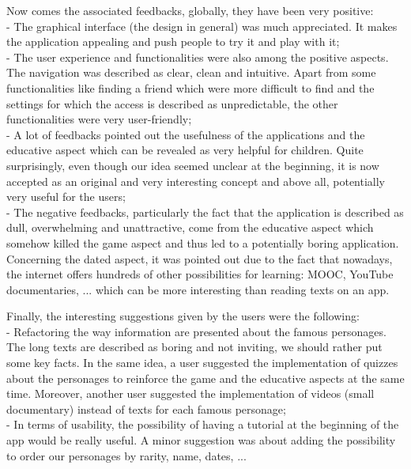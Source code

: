 \documentclass[12pt]{scrartcl}
\begin{document}
	Now comes the associated feedbacks, globally, they have been very positive:\\

		- The graphical interface (the design in general) was much appreciated. It makes the application appealing and push people to try it and play with it;\\

		- The user experience and functionalities were also among the positive aspects. The navigation was described as clear, clean and intuitive. Apart from some functionalities like finding a friend which were more difficult to find and the settings for which the access is described as unpredictable, the other functionalities were very user-friendly;\\

		- A lot of feedbacks pointed out the usefulness of the applications and the educative aspect which can be revealed as very helpful for children. Quite surprisingly, even though our idea seemed unclear at the beginning, it is now accepted as an original and very interesting concept and above all, potentially very useful for the users;\\

		- The negative feedbacks, particularly the fact that the application is described as dull, overwhelming and unattractive, come from the educative aspect which somehow killed the game aspect and thus led to a potentially boring application. Concerning the dated aspect, it was pointed out due to the fact that nowadays, the internet offers hundreds of other possibilities for learning: MOOC, YouTube documentaries, ... which can be more interesting than reading texts on an app.\\
		\newline

	Finally, the interesting suggestions given by the users were the following:\\

		- Refactoring the way information are presented about the famous personages. The long texts are described as boring and not inviting, we should rather put some key facts. In the same idea, a user suggested the implementation of quizzes about the personages to reinforce the game and the educative aspects at the same time. Moreover, another user suggested the implementation of videos (small documentary) instead of texts for each famous personage;\\

		- In terms of usability, the possibility of having a tutorial at the beginning of the app would be really useful. A minor suggestion was about adding the possibility to order our personages by rarity, name, dates, ...\\
\end{document}
